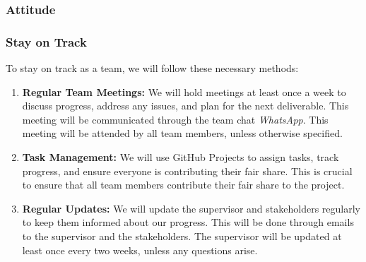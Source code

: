 \documentclass{article}
\begin{document}
\subsubsection*{Attitude}


\subsubsection*{Stay on Track}

\iffalse
\wss{What methods will be used to keep the team on track? How will your team
ensure that members contribute as expected to the team and that the team
performs as expected? How will your team reward members who do well and manage
members whose performance is below expectations?  What are the consequences for
someone not contributing their fair share?}

\wss{You may wish to use the project management metrics collected for the TA and
instructor for this.}

\wss{You can set target metrics for attendance, commits, etc.  What are the
consequences if someone doesn't hit their targets?  Do they need to bring the
coffee to the next team meeting?  Does the team need to make an appointment with
their TA, or the instructor?  Are there incentives for reaching targets early?}
\fi

To stay on track as a team, we will follow these necessary methods:

\begin{enumerate}
  \item \textbf{Regular Team Meetings:} We will hold meetings at least once a week to discuss progress, address any issues, and plan for the next deliverable. This meeting will be communicated through the team chat \textit{WhatsApp}. This meeting will be attended by all team members, unless otherwise specified.
  \item \textbf{Task Management:} We will use GitHub Projects to assign tasks, track progress, and ensure everyone is contributing their fair share. This is crucial to ensure that all team members contribute their fair share to the project.
  \item \textbf{Regular Updates:} We will update the supervisor and stakeholders regularly to keep them informed about our progress. This will be done through emails to the supervisor and the stakeholders. The supervisor will be updated at least once every two weeks, unless any questions arise.
\end{enumerate}
\end{document}
